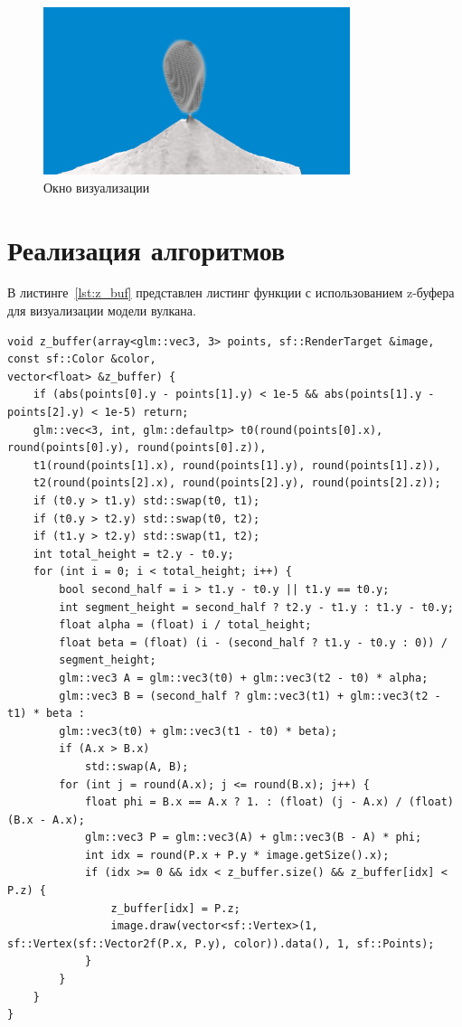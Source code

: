 \begin{figure}[H]
	\centering
	\includegraphics[width=0.8\textwidth, page=1]{assets/img/visualization.png}   
	\caption{Окно визуализации}
	\label{fig:vis}
\end{figure}

\section{Реализация алгоритмов}

В листинге~\ref{lst:z_buf} представлен листинг функции с использованием z-буфера для визуализации модели вулкана.
\clearpage 
\begin{lstlisting}[caption={Функция использующая z-буфер для визуализации треугольника},label={lst:z_buf}]
void z_buffer(array<glm::vec3, 3> points, sf::RenderTarget &image, const sf::Color &color,
vector<float> &z_buffer) {
	if (abs(points[0].y - points[1].y) < 1e-5 && abs(points[1].y - points[2].y) < 1e-5) return;
	glm::vec<3, int, glm::defaultp> t0(round(points[0].x), round(points[0].y), round(points[0].z)),
	t1(round(points[1].x), round(points[1].y), round(points[1].z)),
	t2(round(points[2].x), round(points[2].y), round(points[2].z));
	if (t0.y > t1.y) std::swap(t0, t1);
	if (t0.y > t2.y) std::swap(t0, t2);
	if (t1.y > t2.y) std::swap(t1, t2);
	int total_height = t2.y - t0.y;
	for (int i = 0; i < total_height; i++) {
		bool second_half = i > t1.y - t0.y || t1.y == t0.y;
		int segment_height = second_half ? t2.y - t1.y : t1.y - t0.y;
		float alpha = (float) i / total_height;
		float beta = (float) (i - (second_half ? t1.y - t0.y : 0)) /
		segment_height;
		glm::vec3 A = glm::vec3(t0) + glm::vec3(t2 - t0) * alpha;
		glm::vec3 B = (second_half ? glm::vec3(t1) + glm::vec3(t2 - t1) * beta :
		glm::vec3(t0) + glm::vec3(t1 - t0) * beta);
		if (A.x > B.x) 
			std::swap(A, B);
		for (int j = round(A.x); j <= round(B.x); j++) {
			float phi = B.x == A.x ? 1. : (float) (j - A.x) / (float) (B.x - A.x);
			glm::vec3 P = glm::vec3(A) + glm::vec3(B - A) * phi;
			int idx = round(P.x + P.y * image.getSize().x);
			if (idx >= 0 && idx < z_buffer.size() && z_buffer[idx] < P.z) {
				z_buffer[idx] = P.z;
				image.draw(vector<sf::Vertex>(1, sf::Vertex(sf::Vector2f(P.x, P.y), color)).data(), 1, sf::Points);
			}
		}
	}
}
\end{lstlisting}

